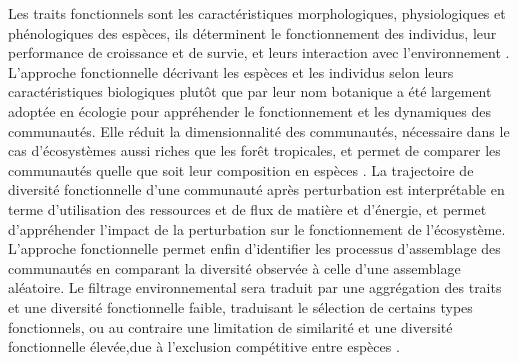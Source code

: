 \documentclass[
  11pt,
  french,
  A4paper,
  extrafontsizes,onecolumn,openright
  ]{memoir}
\begin{document}
Les traits fonctionnels sont les caractéristiques morphologiques,
physiologiques et phénologiques des espèces, ils déterminent le
fonctionnement des individus, leur performance de croissance et de
survie, et leurs interaction avec l'environnement
\autocite{Violle2007b}. L'approche fonctionnelle décrivant les espèces
et les individus selon leurs caractéristiques biologiques plutôt que par
leur nom botanique a été largement adoptée en écologie pour appréhender
le fonctionnement et les dynamiques des communautés. Elle réduit la
dimensionnalité des communautés, nécessaire dans le cas d'écosystèmes
aussi riches que les forêt tropicales, et permet de comparer les
communautés quelle que soit leur composition en espèces
\autocites{Begon2006}{Scheiter2013}{Mouillot2013a}{Sakschewski2016}. La
trajectoire de diversité fonctionnelle d'une communauté après
perturbation est interprétable en terme d'utilisation des ressources et
de flux de matière et d'énergie, et permet d'appréhender l'impact de la
perturbation sur le fonctionnement de l'écosystème. L'approche
fonctionnelle permet enfin d'identifier les processus d'assemblage des
communautés en comparant la diversité observée à celle d'une assemblage
aléatoire. Le filtrage environnemental sera traduit par une aggrégation
des traits et une diversité fonctionnelle faible, traduisant le
sélection de certains types fonctionnels, ou au contraire une limitation
de similarité et une diversité fonctionnelle élevée,due à l'exclusion
compétitive entre espèces \autocite{Refelodie}.
\end{document}
